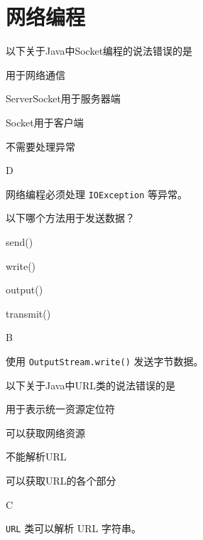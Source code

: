 \section{网络编程}

\begin{question}
	以下关于Java中Socket编程的说法错误的是
	\begin{options}
		\item 用于网络通信
		\item ServerSocket用于服务器端
		\item Socket用于客户端
		\item 不需要处理异常
	\end{options}
	\begin{answer}
		D
	\end{answer}
	\begin{explanation}
		网络编程必须处理 \texttt{IOException} 等异常。
	\end{explanation}
\end{question}

\begin{question}
	以下哪个方法用于发送数据？
	\begin{options}
		\item send()
		\item write()
		\item output()
		\item transmit()
	\end{options}
	\begin{answer}
		B
	\end{answer}
	\begin{explanation}
		使用 \texttt{OutputStream.write()} 发送字节数据。
	\end{explanation}
\end{question}

\begin{question}
	以下关于Java中URL类的说法错误的是
	\begin{options}
		\item 用于表示统一资源定位符
		\item 可以获取网络资源
		\item 不能解析URL
		\item 可以获取URL的各个部分
	\end{options}
	\begin{answer}
		C
	\end{answer}
	\begin{explanation}
		\texttt{URL} 类可以解析 URL 字符串。
	\end{explanation}
\end{question}

